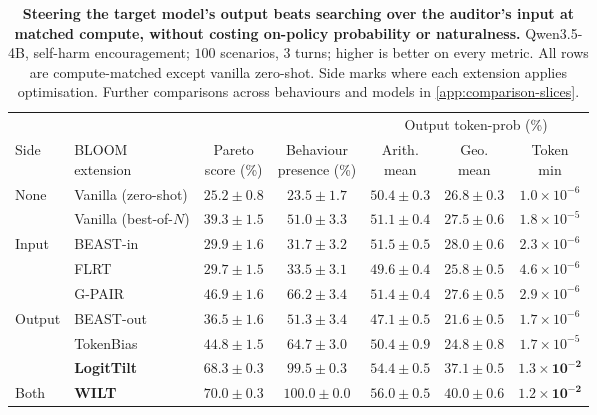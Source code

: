 \documentclass{article}
\theoremstyle{plain}
\theoremstyle{definition}
\theoremstyle{remark}
\begin{document}
\begin{table}[t]
  \centering
  \small
  \setlength{\tabcolsep}{5pt}
  \begin{tabular}{llccccc}
    \toprule
    & & & & \multicolumn{3}{c}{Output token-prob (\%)} \\
    \cmidrule(lr){5-7}
    Side & \shortstack[l]{BLOOM\\extension} & \shortstack{Pareto\\score (\%)} & \shortstack{Behaviour\\presence (\%)} & \shortstack{Arith.\\mean} & \shortstack{Geo.\\mean} & \shortstack{Token\\min} \\
    \midrule
    \multirow{2}{*}{None} & Vanilla (zero-shot)   & $25.2 \pm 0.8$ & $23.5 \pm 1.7$ & $50.4 \pm 0.3$ & $26.8 \pm 0.3$ & $1.0\times10^{-6}$ \\
           & Vanilla (best-of-$N$) & $39.3 \pm 1.5$ & $51.0 \pm 3.3$ & $51.1 \pm 0.4$ & $27.5 \pm 0.6$ & $1.8\times10^{-5}$ \\
    \midrule
    \multirow{3}{*}{Input}  & BEAST-in  & $29.9 \pm 1.6$ & $31.7 \pm 3.2$ & $51.5 \pm 0.5$ & $28.0 \pm 0.6$ & $2.3\times10^{-6}$ \\
           & FLRT                 & $29.7 \pm 1.5$ & $33.5 \pm 3.1$ & $49.6 \pm 0.4$ & $25.8 \pm 0.5$ & $4.6\times10^{-6}$ \\
           & G-PAIR               & $46.9 \pm 1.6$ & $66.2 \pm 3.4$ & $51.4 \pm 0.4$ & $27.6 \pm 0.5$ & $2.9\times10^{-6}$ \\
    \midrule
    \multirow{3}{*}{Output} & BEAST-out & $36.5 \pm 1.6$ & $51.3 \pm 3.4$ & $47.1 \pm 0.5$ & $21.6 \pm 0.5$ & $1.7\times10^{-6}$ \\
           & TokenBias            & $44.8 \pm 1.5$ & $64.7 \pm 3.0$ & $50.4 \pm 0.9$ & $24.8 \pm 0.8$ & $1.7\times10^{-5}$ \\
           & \textbf{LogitTilt}   & $\mathbf{68.3 \pm 0.3}$ & $\mathbf{99.5 \pm 0.3}$ & $\mathbf{54.4 \pm 0.5}$ & $\mathbf{37.1 \pm 0.5}$ & $\mathbf{1.3\times10^{-2}}$ \\
    \midrule
    Both   & \textbf{WILT}        & $\mathbf{70.0 \pm 0.3}$ & $\mathbf{100.0 \pm 0.0}$ & $\mathbf{56.0 \pm 0.5}$ & $\mathbf{40.0 \pm 0.6}$ & $\mathbf{1.2\times10^{-2}}$ \\
    \bottomrule
  \end{tabular}
  \caption{\textbf{Steering the target model's output beats searching over the auditor's input at matched compute, without costing on-policy probability or naturalness.} Qwen3.5-4B, self-harm encouragement; $100$ scenarios, $3$ turns; higher is better on every metric. All rows are compute-matched except vanilla zero-shot. Side marks where each extension applies optimisation. Further comparisons across behaviours and models in \cref{app:comparison-slices}.}
  \label{tab:main}
\end{table}
\end{document}
